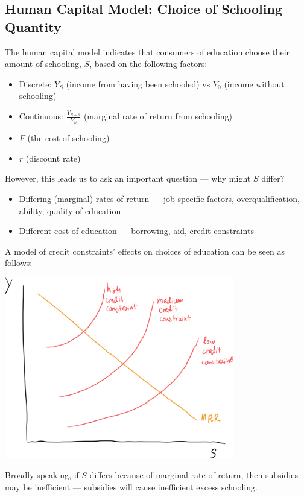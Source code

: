 \documentclass[10pt]{extarticle}
\begin{document}
  \subsection{Human Capital Model: Choice of Schooling Quantity}%
  The human capital model indicates that consumers of education choose their amount of schooling, $S$, based on the following factors:
  \begin{itemize}
    \item Discrete: $Y_S$ (income from having been schooled) vs $Y_0$ (income without schooling)
    \item Continuous: $\frac{Y_{S+1}}{Y_S}$ (marginal rate of return from schooling)
    \item $F$ (the cost of schooling)
    \item $r$ (discount rate)
  \end{itemize}
  However, this leads us to ask an important question --- why might $S$ differ?
  \begin{itemize}
    \item Differing (marginal) rates of return --- job-specific factors, overqualification, ability, quality of education
    \item Different cost of education --- borrowing, aid, credit constraints
  \end{itemize}
  A model of credit constraints' effects on choices of education can be seen as follows:
  \begin{center}
    \includegraphics[width=10cm]{images/credit_constraints.png}
  \end{center}
  Broadly speaking, if $S$ differs because of marginal rate of return, then subsidies may be inefficient --- subsidies will cause inefficient excess schooling.\\
\end{document}
